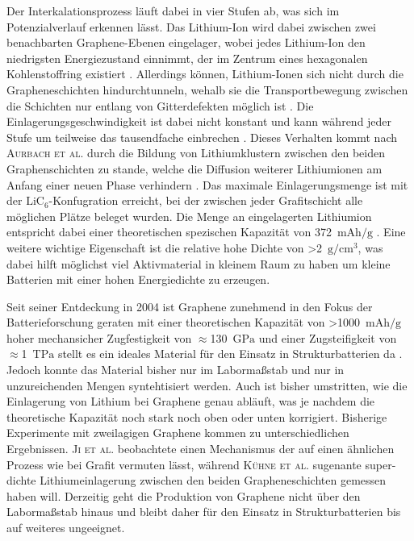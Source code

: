 Der Interkalationsprozess läuft dabei in vier Stufen ab, was sich im Potenzialverlauf erkennen lässt. Das Lithium-Ion wird dabei zwischen zwei benachbarten Graphene-Ebenen eingelager, wobei jedes Lithium-Ion den niedrigsten Energiezustand einnimmt, der im Zentrum eines hexagonalen Kohlenstoffring existiert \cite{Sole2014,Weng2023}. Allerdings können, Lithium-Ionen sich nicht durch die Grapheneschichten hindurchtunneln, wehalb sie die Transportbewegung zwischen die Schichten nur entlang von Gitterdefekten möglich ist \cite{Nishidate2005}. Die Einlagerungsgeschwindigkeit ist dabei nicht konstant und kann während jeder Stufe um teilweise das tausendfache einbrechen \cite{Levi1997}. Dieses Verhalten kommt nach \textsc{Aurbach et al.} durch die Bildung von Lithiumklustern zwischen den beiden Graphenschichten zu stande, welche die Diffusion weiterer Lithiumionen am Anfang einer neuen Phase verhindern \cite{Markevich2005}.  Das maximale Einlagerungsmenge ist mit der $\text{LiC}_\text{6}$-Konfugration erreicht, bei der zwischen jeder Grafitschicht alle möglichen Plätze beleget wurden. Die Menge an eingelagerten Lithiumion entspricht dabei  einer theoretischen spezischen Kapazität von 372~$\si{\mA \hour \per \g}$ \cite{Winter1998}. 
Eine weitere wichtige Eigenschaft ist die relative hohe Dichte von >2~$\si{\g \per \cm \cubed}$, was dabei hilft möglichst viel Aktivmaterial in kleinem Raum zu haben um kleine Batterien mit einer hohen Energiedichte zu erzeugen.

Seit seiner Entdeckung in 2004 \cite{Novoselov2004} ist Graphene zunehmend in den Fokus der Batterieforschung geraten mit einer theoretischen Kapazität von >1000~$\si{\mA \hour \per \g}$ hoher mechansicher Zugfestigkeit von $\approx$130~$\si{\GPa}$ und einer Zugsteifigkeit von $\approx$1~$\si{\tera \Pa}$ stellt es ein ideales Material für den Einsatz in Strukturbatterien da \cite{Novoselov2012}. Jedoch konnte das Material bisher nur im Labormaßstab und nur in unzureichenden Mengen syntehtisiert werden. Auch ist bisher umstritten, wie die Einlagerung von Lithium bei Graphene genau abläuft, was je nachdem die theoretische Kapazität noch stark noch oben oder unten korrigiert. Bisherige Experimente mit zweilagigen Graphene kommen zu unterschiedlichen Ergebnissen. \textsc{Ji et al.} beobachtete einen Mechanismus der auf einen ähnlichen Prozess wie bei Grafit vermuten lässt, während \textsc{Kühne et al.} sugenante super-dichte Lithiumeinlagerung zwischen den beiden Grapheneschichten gemessen haben will. Derzeitig geht die Produktion von Graphene nicht über den Labormaßstab hinaus und bleibt daher für den Einsatz in Strukturbatterien bis auf weiteres ungeeignet.

